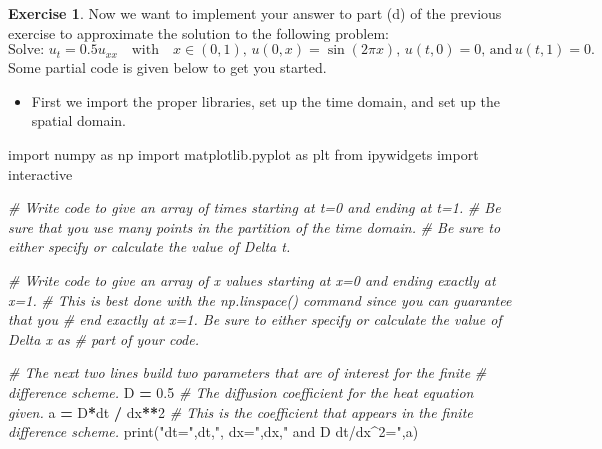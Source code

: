 \documentclass[
]{book}
\newenvironment{Shaded}{\begin{snugshade}}{\end{snugshade}}
\newcommand{\BuiltInTok}[1]{#1}
\newcommand{\CommentTok}[1]{\textcolor[rgb]{0.56,0.35,0.01}{\textit{#1}}}
\newcommand{\DecValTok}[1]{\textcolor[rgb]{0.00,0.00,0.81}{#1}}
\newcommand{\FloatTok}[1]{\textcolor[rgb]{0.00,0.00,0.81}{#1}}
\newcommand{\ImportTok}[1]{#1}
\newcommand{\NormalTok}[1]{#1}
\newcommand{\OperatorTok}[1]{\textcolor[rgb]{0.81,0.36,0.00}{\textbf{#1}}}
\newcommand{\StringTok}[1]{\textcolor[rgb]{0.31,0.60,0.02}{#1}}
\providecommand{\tightlist}{%
  \setlength{\itemsep}{0pt}\setlength{\parskip}{0pt}}
\theoremstyle{definition}
\theoremstyle{definition}
\theoremstyle{definition}
\newtheorem{exercise}{Exercise}[chapter]
\theoremstyle{remark}
\begin{document}
\begin{exercise}
\protect\hypertarget{exr:unnamed-chunk-546}{}{\label{exr:unnamed-chunk-546} }Now we want to implement your answer to part (d) of the previous exercise to approximate the solution to the
following problem:
\[\text{Solve: } u_t = 0.5u_{xx} \quad \text{with} \quad x \in (0,1), \, u(0,x) =
    \sin(2 \pi x), \, u(t,0) = 0, \, \text{and} \, u(t,1) = 0.\]
Some partial code is given below to get you started.
\end{exercise}

\begin{itemize}
\tightlist
\item
  First we import the proper libraries, set up the time domain, and set up the spatial domain.
\end{itemize}

\begin{Shaded}
\begin{Highlighting}[]
\ImportTok{import}\NormalTok{ numpy }\ImportTok{as}\NormalTok{ np}
\ImportTok{import}\NormalTok{ matplotlib.pyplot }\ImportTok{as}\NormalTok{ plt}
\ImportTok{from}\NormalTok{ ipywidgets }\ImportTok{import}\NormalTok{ interactive}

\CommentTok{\# Write code to give an array of times starting at t=0 and ending at t=1.  }
\CommentTok{\# Be sure that you use many points in the partition of the time domain.}
\CommentTok{\# Be sure to either specify or calculate the value of Delta t.}

\CommentTok{\# Write code to give an array of x values starting at x=0 and ending exactly at x=1.}
\CommentTok{\# This is best done with the np.linspace() command since you can guarantee that you }
\CommentTok{\# end exactly at x=1.  Be sure to either specify or calculate the value of Delta x as}
\CommentTok{\# part of your code. }

\CommentTok{\# The next two lines build two parameters that are of interest for the finite}
\CommentTok{\# difference scheme.}
\NormalTok{D }\OperatorTok{=} \FloatTok{0.5} \CommentTok{\# The diffusion coefficient for the heat equation given.}
\NormalTok{a }\OperatorTok{=}\NormalTok{ D}\OperatorTok{*}\NormalTok{dt }\OperatorTok{/}\NormalTok{ dx}\OperatorTok{**}\DecValTok{2} \CommentTok{\# This is the coefficient that appears in the finite difference scheme.}
\BuiltInTok{print}\NormalTok{(}\StringTok{"dt="}\NormalTok{,dt,}\StringTok{", dx="}\NormalTok{,dx,}\StringTok{" and D dt/dx\^{}2="}\NormalTok{,a)}
\end{Highlighting}
\end{Shaded}
\end{document}
